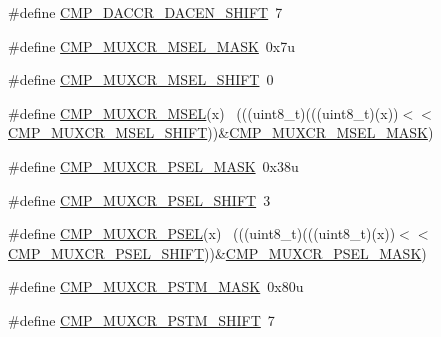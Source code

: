 \begin{DoxyCompactItemize}
\item 
\#define \hyperlink{group___c_m_p___register___masks_ga85aa1686a0d5a7de2375bfab7167bb93}{C\+M\+P\+\_\+\+D\+A\+C\+C\+R\+\_\+\+D\+A\+C\+E\+N\+\_\+\+S\+H\+I\+FT}~7
\item 
\#define \hyperlink{group___c_m_p___register___masks_ga6ff83366097d3be5ae93234b68684cf5}{C\+M\+P\+\_\+\+M\+U\+X\+C\+R\+\_\+\+M\+S\+E\+L\+\_\+\+M\+A\+SK}~0x7u
\item 
\#define \hyperlink{group___c_m_p___register___masks_gad74d8206afe9b7ad009b0a7ac2bbf1cf}{C\+M\+P\+\_\+\+M\+U\+X\+C\+R\+\_\+\+M\+S\+E\+L\+\_\+\+S\+H\+I\+FT}~0
\item 
\#define \hyperlink{group___c_m_p___register___masks_ga61a47f441cc9f0145482ce3f1561160a}{C\+M\+P\+\_\+\+M\+U\+X\+C\+R\+\_\+\+M\+S\+EL}(x)                                            ~(((uint8\+\_\+t)(((uint8\+\_\+t)(x))$<$$<$\hyperlink{group___c_m_p___register___masks_gad74d8206afe9b7ad009b0a7ac2bbf1cf}{C\+M\+P\+\_\+\+M\+U\+X\+C\+R\+\_\+\+M\+S\+E\+L\+\_\+\+S\+H\+I\+FT}))\&\hyperlink{group___c_m_p___register___masks_ga6ff83366097d3be5ae93234b68684cf5}{C\+M\+P\+\_\+\+M\+U\+X\+C\+R\+\_\+\+M\+S\+E\+L\+\_\+\+M\+A\+SK})
\item 
\#define \hyperlink{group___c_m_p___register___masks_gaba9739da107b2a2b908af338d14df160}{C\+M\+P\+\_\+\+M\+U\+X\+C\+R\+\_\+\+P\+S\+E\+L\+\_\+\+M\+A\+SK}~0x38u
\item 
\#define \hyperlink{group___c_m_p___register___masks_gab686629f56ced4b88c699f0f610dece5}{C\+M\+P\+\_\+\+M\+U\+X\+C\+R\+\_\+\+P\+S\+E\+L\+\_\+\+S\+H\+I\+FT}~3
\item 
\#define \hyperlink{group___c_m_p___register___masks_gae2f01a26dfcb880ec6dcca859629c743}{C\+M\+P\+\_\+\+M\+U\+X\+C\+R\+\_\+\+P\+S\+EL}(x)                                            ~(((uint8\+\_\+t)(((uint8\+\_\+t)(x))$<$$<$\hyperlink{group___c_m_p___register___masks_gab686629f56ced4b88c699f0f610dece5}{C\+M\+P\+\_\+\+M\+U\+X\+C\+R\+\_\+\+P\+S\+E\+L\+\_\+\+S\+H\+I\+FT}))\&\hyperlink{group___c_m_p___register___masks_gaba9739da107b2a2b908af338d14df160}{C\+M\+P\+\_\+\+M\+U\+X\+C\+R\+\_\+\+P\+S\+E\+L\+\_\+\+M\+A\+SK})
\item 
\#define \hyperlink{group___c_m_p___register___masks_ga5636686e652e5c89b119ff1954c0e98a}{C\+M\+P\+\_\+\+M\+U\+X\+C\+R\+\_\+\+P\+S\+T\+M\+\_\+\+M\+A\+SK}~0x80u
\item 
\#define \hyperlink{group___c_m_p___register___masks_gafd77773e4a14b8f22b0b00c52a180d0c}{C\+M\+P\+\_\+\+M\+U\+X\+C\+R\+\_\+\+P\+S\+T\+M\+\_\+\+S\+H\+I\+FT}~7
\end{DoxyCompactItemize}


